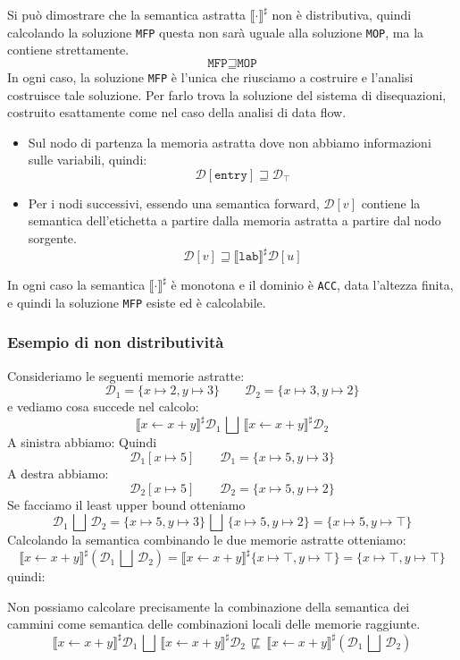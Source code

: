 Si può dimostrare che la semantica astratta $\llbracket \cdot \rrbracket^\sharp$ non 
è distributiva, quindi calcolando la soluzione \texttt{MFP} questa non sarà uguale 
alla soluzione \texttt{MOP}, ma la contiene strettamente.
\[
  \texttt{MFP} \sqsupseteq \texttt{MOP}  
\]
In ogni caso, la soluzione \texttt{MFP} è l'unica che riusciamo a costruire e l'analisi 
costruisce tale soluzione. 
Per farlo trova la soluzione del sistema di disequazioni, costruito esattamente come nel 
caso della analisi di data flow.
\begin{itemize}
    \item Sul nodo di partenza la memoria astratta dove 
    non abbiamo informazioni sulle variabili, quindi:
    \[
        \mathcal{D}[\texttt{entry}] \sqsupseteq \mathcal{D}_\top
    \]
    \item Per i nodi successivi, essendo una semantica forward, $\mathcal{D}[v]$ contiene 
    la semantica dell'etichetta a partire dalla memoria astratta a 
    partire dal nodo sorgente.
    \[
        \mathcal{D}[v] \sqsupseteq \llbracket \texttt{lab} \rrbracket^\sharp \mathcal{D}[u]
    \]
\end{itemize}
In ogni caso la semantica $\llbracket \cdot \rrbracket^\sharp$ è monotona e il 
dominio è \texttt{ACC}, data l'altezza finita, e quindi la soluzione \texttt{MFP} 
esiste ed è calcolabile.
\subsubsection{Esempio di non distributività}
Consideriamo le seguenti memorie astratte:
\[
    \mathcal{D}_1 = \{ x \mapsto 2, y \mapsto 3 \} \qquad
    \mathcal{D}_2 = \{ x \mapsto 3, y \mapsto 2 \}
\]
e vediamo cosa succede nel calcolo:
\[
    \llbracket x \gets x + y \rrbracket^\sharp \mathcal{D}_1 
    \,\bigsqcup\, 
    \llbracket x \gets x + y \rrbracket^\sharp \mathcal{D}_2
\]
A sinistra abbiamo:
Quindi 
\[
    \mathcal{D}_1 [x \mapsto 5] \qquad \mathcal{D}_1 = \{ x \mapsto 5, y \mapsto 3 \}
\]
A destra abbiamo:
\[
    \mathcal{D}_2 [x \mapsto 5] \qquad \mathcal{D}_2 = \{ x \mapsto 5, y \mapsto 2 \}
\]
Se facciamo il least upper bound otteniamo 
\[
    \mathcal{D}_1 \,\bigsqcup\, \mathcal{D}_2 = 
    \{ x \mapsto 5, y \mapsto 3 \} \,\bigsqcup\, \{ x \mapsto 5, y \mapsto 2 \} = 
    \{ x \mapsto 5, y \mapsto \top \}
\]
Calcolando la semantica combinando le due memorie astratte otteniamo:
\[
    \llbracket x \gets x + y \rrbracket^\sharp (\mathcal{D}_1 \,\bigsqcup\, \mathcal{D}_2) = 
    \llbracket x \gets x + y \rrbracket^\sharp \{ x \mapsto \top, y \mapsto \top \} =
    \{ x \mapsto \top, y \mapsto \top \}
\]
quindi:
\begin{tcolorbox}[title = Non distributività della semantica]
    Non possiamo calcolare precisamente la combinazione della semantica dei cammini
    come semantica delle combinazioni locali delle memorie raggiunte.
    \[
        \llbracket x \gets x + y \rrbracket^\sharp \mathcal{D}_1
        \,\bigsqcup\,
        \llbracket x \gets x + y \rrbracket^\sharp \mathcal{D}_2
        \,\not \sqsubseteq\,
        \llbracket x \gets x + y \rrbracket^\sharp (\mathcal{D}_1 \,\bigsqcup\, \mathcal{D}_2)
    \]
\end{tcolorbox}
